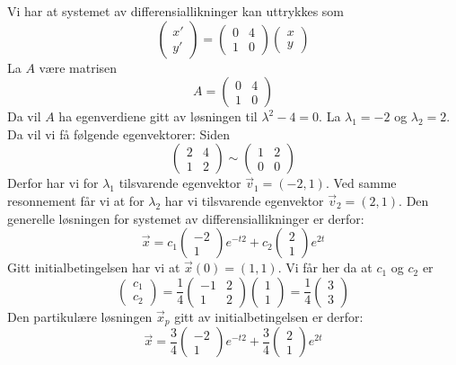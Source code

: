 \deloppgave
Vi har at systemet av differensiallikninger kan uttrykkes som
$$
\begin{pmatrix}
	x'\\y'
\end{pmatrix} =
\begin{pmatrix}
	0 & 4\\
	1 & 0
\end{pmatrix}\begin{pmatrix}
	x\\y
\end{pmatrix}
$$
La $A$ være matrisen
$$
A = \begin{pmatrix}
	0 & 4\\
	1 & 0
\end{pmatrix}
$$
Da vil $A$ ha egenverdiene gitt av løsningen til $\lambda^2 - 4 = 0$. La $\lambda_1 = -2$ og $\lambda_2 = 2$. Da vil vi få følgende egenvektorer: Siden
$$
\begin{pmatrix}
	2 & 4\\
	1 & 2
\end{pmatrix} \sim
\begin{pmatrix}
	1 & 2\\
	0 & 0
\end{pmatrix}
$$
Derfor har vi for $\lambda_1$ tilsvarende egenvektor $\vec{v}_1 = (-2, 1)$. Ved samme resonnement får vi at for $\lambda_2$ har vi tilsvarende egenvektor $\vec{v}_2 = (2, 1)$. Den generelle løsningen for systemet av differensiallikninger er derfor:
$$
\vec{x} = c_1\begin{pmatrix}
	-2\\1
\end{pmatrix} e^{-t2} + c_2\begin{pmatrix}
	2\\1
\end{pmatrix}e^{2t}
$$
Gitt initialbetingelsen har vi at $\vec{x}(0) = (1,1)$. Vi får her da at $c_1$ og $c_2$ er
$$
\begin{pmatrix}
	c_1\\c_2
\end{pmatrix} = \frac{1}{4}\begin{pmatrix}
	-1 & 2\\
	1 & 2
\end{pmatrix}\begin{pmatrix}
	1\\1
\end{pmatrix} = \frac{1}{4}\begin{pmatrix}
	3\\3
\end{pmatrix}
$$
Den partikulære løsningen $\vec{x}_p$ gitt av initialbetingelsen er derfor:
$$
\vec{x} = \frac{3}{4}\begin{pmatrix}
	-2\\1
\end{pmatrix} e^{-t2} + \frac{3}{4}\begin{pmatrix}
	2\\1
\end{pmatrix}e^{2t}
$$

